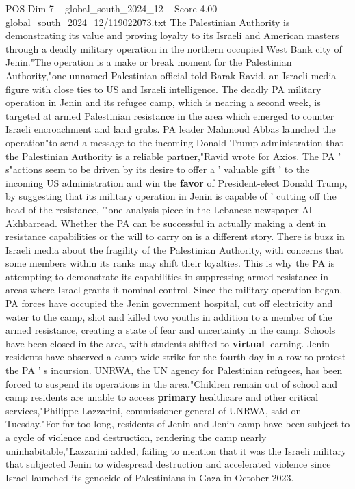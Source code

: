 \begin{textsample}{POS Dim 7 – global\_south\_2024\_12 – Score 4.00 – global\_south\_2024\_12/119022073.txt}  \label{ex:f7_pos_353}
The Palestinian Authority is demonstrating its value and proving loyalty to its Israeli and American masters through a deadly military operation in the northern occupied West Bank city of Jenin."The operation is a make or break moment for the Palestinian Authority,"one unnamed Palestinian official told Barak Ravid, an Israeli media figure with close ties to US and Israeli intelligence.
The deadly PA military operation in Jenin and its refugee camp, which is nearing a second week, is targeted at armed Palestinian resistance in the area which emerged to counter Israeli encroachment and land grabs.
PA leader Mahmoud Abbas launched the operation"to send a message to the incoming Donald Trump administration that the Palestinian Authority is a reliable partner,"Ravid wrote for Axios.
The PA ' s"actions seem to be driven by its desire to offer a ' valuable gift ' to the incoming US administration and win the \textbf{favor} of President-elect Donald Trump, by suggesting that its military operation in Jenin is capable of ' cutting off the head of the resistance, '"one analysis piece in the Lebanese newspaper Al-Akhbarread.
Whether the PA can be successful in actually making a dent in resistance capabilities or the will to carry on is a different story.
There is buzz in Israeli media about the fragility of the Palestinian Authority, with concerns that some members within its ranks may shift their loyalties.
This is why the PA is attempting to demonstrate its capabilities in suppressing armed resistance in areas where Israel grants it nominal control.
Since the military operation began, PA forces have occupied the Jenin government hospital, cut off electricity and water to the camp, shot and killed two youths in addition to a member of the armed resistance, creating a state of fear and uncertainty in the camp.
Schools have been closed in the area, with students shifted to \textbf{virtual} learning.
Jenin residents have observed a camp-wide strike for the fourth day in a row to protest the PA ' s incursion.
UNRWA, the UN agency for Palestinian refugees, has been forced to suspend its operations in the area."Children remain out of school and camp residents are unable to access \textbf{primary} healthcare and other critical services,"Philippe Lazzarini, commissioner-general of UNRWA, said on Tuesday."For far too long, residents of Jenin and Jenin camp have been subject to a cycle of violence and destruction, rendering the camp nearly uninhabitable,"Lazzarini added, failing to mention that it was the Israeli military that subjected Jenin to widespread destruction and accelerated violence since Israel launched its genocide of Palestinians in Gaza in October 2023.

\end{textsample}
